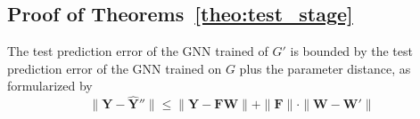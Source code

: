 

\subsection{Proof of Theorems~\ref{theo:test_stage}}
\label{app:proof_test_stage}
\begin{theorem-nonumber}
    The test prediction error of the GNN trained of $G'$ is bounded by the test prediction error of the GNN trained on $G$ plus the parameter distance, as formularized by 
    \begin{equation*}
        \| \mathbf{Y} - \hat{\mathbf{Y}}'' \| \leq \| \mathbf{Y} - \mathbf{F}\mathbf{W} \| + \|\mathbf{F}\| \cdot \| \mathbf{W}- \mathbf{W}'\|
    \end{equation*}
\end{theorem-nonumber}

